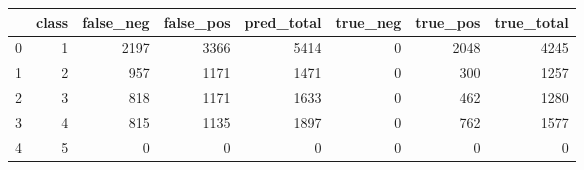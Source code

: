 \begin{tabular}{lrrrrrrr}
\toprule
 & class & false_neg & false_pos & pred_total & true_neg & true_pos & true_total \\
\midrule
0 & 1 & 2197 & 3366 & 5414 & 0 & 2048 & 4245 \\
1 & 2 & 957 & 1171 & 1471 & 0 & 300 & 1257 \\
2 & 3 & 818 & 1171 & 1633 & 0 & 462 & 1280 \\
3 & 4 & 815 & 1135 & 1897 & 0 & 762 & 1577 \\
4 & 5 & 0 & 0 & 0 & 0 & 0 & 0 \\
\bottomrule
\end{tabular}
